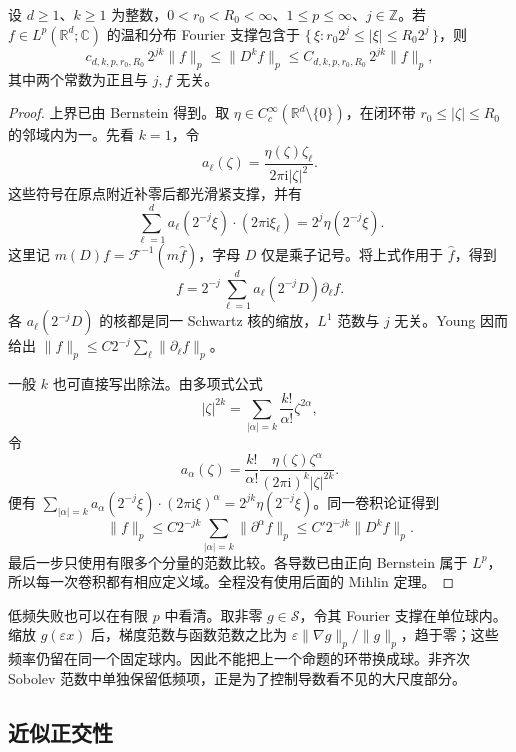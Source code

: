 \begin{proposition}[环带上的导数尺度]\label{b2:prop:19-annular-bernstein}
设 \(d\geq1\)、\(k\geq1\) 为整数，\(0<r_0<R_0<\infty\)、\(1\leq p\leq\infty\)、\(j\in\mathbb Z\)。若 \(f\in L^p(\mathbb R^d;\mathbb C)\) 的温和分布 Fourier 支撑包含于
\(\{\,\xi:r_0 2^j\leq|\xi|\leq R_0 2^j\,\}\)，则
\[
 c_{d,k,p,r_0,R_0}\,2^{jk}\|f\|_p
 \leq\|D^kf\|_p
 \leq C_{d,k,p,r_0,R_0}\,2^{jk}\|f\|_p,
\]
其中两个常数为正且与 \(j,f\) 无关。
\end{proposition}
\begin{proof}
上界已由 Bernstein 得到。取 \(\eta\in C_c^\infty(\mathbb R^d\setminus\{0\})\)，在闭环带 \(r_0\leq|\zeta|\leq R_0\) 的邻域内为一。先看 \(k=1\)，令
\[
 a_\ell(\zeta)=\frac{\eta(\zeta)\zeta_\ell}
                         {2\pi\mathrm i|\zeta|^2}.
\]
这些符号在原点附近补零后都光滑紧支撑，并有
\[
 \sum_{\ell=1}^d a_\ell(2^{-j}\xi)
                       \cdot(2\pi\mathrm i\xi_\ell)
 =2^j\eta(2^{-j}\xi).
\]
这里记 \(m(D)f=\mathcal F^{-1}(m\widehat f)\)，字母 \(D\) 仅是乘子记号。将上式作用于 \(\widehat f\)，得到
\[
 f=2^{-j}\sum_{\ell=1}^d a_\ell(2^{-j}D)\partial_\ell f.
\]
各 \(a_\ell(2^{-j}D)\) 的核都是同一 Schwartz 核的缩放，\(L^1\) 范数与 \(j\) 无关。Young 因而给出 \(\|f\|_p\leq C2^{-j}\sum_\ell\|\partial_\ell f\|_p\)。

一般 \(k\) 也可直接写出除法。由多项式公式
\[
 |\zeta|^{2k}
 =\sum_{|\alpha|=k}\frac{k!}{\alpha!}\zeta^{2\alpha},
\]
令
\[
 a_\alpha(\zeta)=\frac{k!}{\alpha!}
 \frac{\eta(\zeta)\zeta^\alpha}{(2\pi\mathrm i)^k|\zeta|^{2k}}.
\]
便有 \(\sum_{|\alpha|=k}a_\alpha(2^{-j}\xi)\cdot(2\pi\mathrm i\xi)^\alpha=2^{jk}\eta(2^{-j}\xi)\)。同一卷积论证得到
\[
 \|f\|_p\leq C2^{-jk}\sum_{|\alpha|=k}\|\partial^\alpha f\|_p
 \leq C'2^{-jk}\|D^kf\|_p.
\]
最后一步只使用有限多个分量的范数比较。各导数已由正向 Bernstein 属于 \(L^p\)，所以每一次卷积都有相应定义域。全程没有使用后面的 Mihlin 定理。
\end{proof}

低频失败也可以在有限 \(p\) 中看清。取非零 \(g\in\mathcal S\)，令其 Fourier 支撑在单位球内。缩放 \(g(\varepsilon x)\) 后，梯度范数与函数范数之比为 \(\varepsilon\|\nabla g\|_p/\|g\|_p\)，趋于零；这些频率仍留在同一个固定球内。因此不能把上一个命题的环带换成球。非齐次 Sobolev 范数中单独保留低频项，正是为了控制导数看不见的大尺度部分。

\subsection{近似正交性}
\label{b2:subsec:190304}

